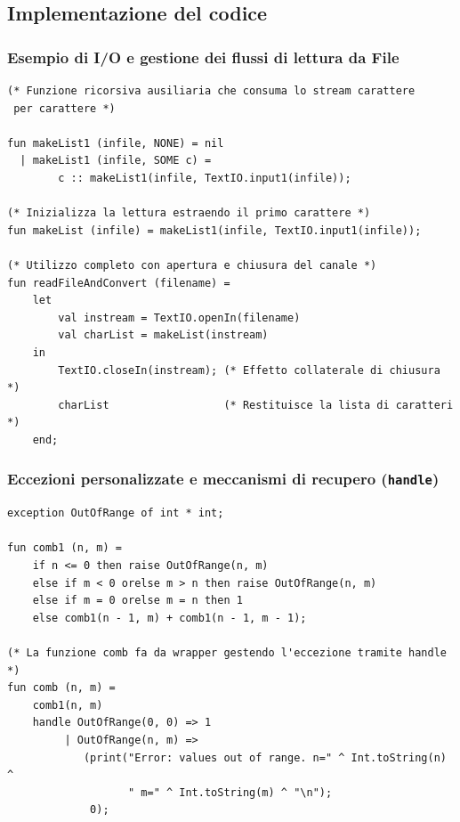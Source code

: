 \documentclass[12pt, a4paper]{article}
\begin{document}
\newpage

\subsection{Implementazione del codice}

\subsubsection{Esempio di I/O e gestione dei flussi di lettura da File}
\begin{verbatim}
(* Funzione ricorsiva ausiliaria che consuma lo stream carattere 
 per carattere *)
 
fun makeList1 (infile, NONE) = nil
  | makeList1 (infile, SOME c) = 
        c :: makeList1(infile, TextIO.input1(infile));

(* Inizializza la lettura estraendo il primo carattere *)
fun makeList (infile) = makeList1(infile, TextIO.input1(infile));

(* Utilizzo completo con apertura e chiusura del canale *)
fun readFileAndConvert (filename) =
    let
        val instream = TextIO.openIn(filename)
        val charList = makeList(instream)
    in
        TextIO.closeIn(instream); (* Effetto collaterale di chiusura *)
        charList                  (* Restituisce la lista di caratteri *)
    end;
\end{verbatim}

\subsubsection{Eccezioni personalizzate e meccanismi di recupero (\texttt{handle})}
\begin{verbatim}
exception OutOfRange of int * int;

fun comb1 (n, m) =
    if n <= 0 then raise OutOfRange(n, m)
    else if m < 0 orelse m > n then raise OutOfRange(n, m)
    else if m = 0 orelse m = n then 1
    else comb1(n - 1, m) + comb1(n - 1, m - 1);

(* La funzione comb fa da wrapper gestendo l'eccezione tramite handle *)
fun comb (n, m) = 
    comb1(n, m) 
    handle OutOfRange(0, 0) => 1
         | OutOfRange(n, m) => 
            (print("Error: values out of range. n=" ^ Int.toString(n) ^ 
                   " m=" ^ Int.toString(m) ^ "\n"); 
             0);
\end{verbatim}

\newpage
\end{document}
